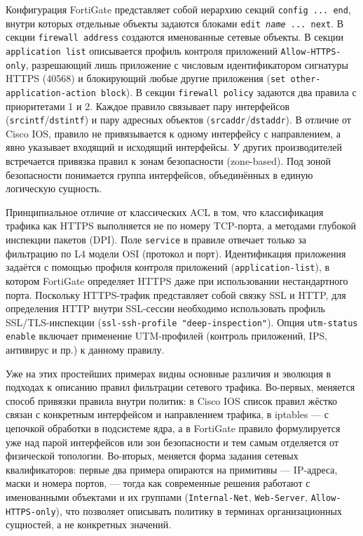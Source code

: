 Конфигурация FortiGate представляет собой иерархию секций \texttt{config ... end}, внутри которых отдельные объекты задаются блоками \texttt{edit \emph{name} ... next}. В секции \texttt{firewall address} создаются именованные сетевые объекты. В секции \texttt{application list} описывается профиль контроля приложений \texttt{Allow-HTTPS-only}, разрешающий лишь приложение с числовым идентификатором сигнатуры HTTPS (40568) и блокирующий любые другие приложения (\texttt{set other-application-action block}). В секции \texttt{firewall policy} задаются два правила с приоритетами 1 и 2. Каждое правило связывает пару интерфейсов (\texttt{srcintf}/\texttt{dstintf}) и пару адресных объектов (\texttt{srcaddr}/\texttt{dstaddr}). В отличие от Cisco IOS, правило не привязывается к одному интерфейсу с направлением, а явно указывает входящий и исходящий интерфейсы. У других производителей встречается привязка правил к зонам безопасности (zone-based). Под зоной безопасности понимается группа интерфейсов, объединённых в единую логическую сущность.

Принципиальное отличие от классических ACL в том, что классификация трафика как HTTPS выполняется не по номеру TCP-порта, а методами глубокой инспекции пакетов (DPI). Поле \texttt{service} в правиле отвечает только за фильтрацию по L4 модели OSI (протокол и порт). Идентификация приложения задаётся с помощью профиля контроля приложений (\texttt{application-list}), в котором FortiGate определяет HTTPS даже при использовании нестандартного порта. Поскольку HTTPS-трафик представляет собой связку SSL и HTTP, для определения HTTP внутри SSL-сессии необходимо использовать профиль SSL/TLS-инспекции (\texttt{ssl-ssh-profile "deep-inspection"}). Опция \texttt{utm-status enable} включает применение UTM-профилей (контроль приложений, IPS, антивирус и пр.) к данному правилу.

Уже на этих простейших примерах видны основные различия и эволюция в подходах к описанию правил фильтрации сетевого трафика. Во-первых, меняется способ привязки правила внутри политик: в Cisco IOS список правил жёстко связан с конкретным интерфейсом и направлением трафика, в iptables --- с цепочкой обработки в подсистеме ядра, а в FortiGate правило формулируется уже над парой интерфейсов или зон безопасности и тем самым отделяется от физической топологии. Во-вторых, меняется форма задания сетевых квалификаторов: первые два примера опираются на примитивы --- IP-адреса, маски и номера портов, --- тогда как современные решения работают с именованными объектами и их группами (\texttt{Internal-Net}, \texttt{Web-Server}, \texttt{Allow-HTTPS-only}), что позволяет описывать политику в терминах организационных сущностей, а не конкретных значений.

